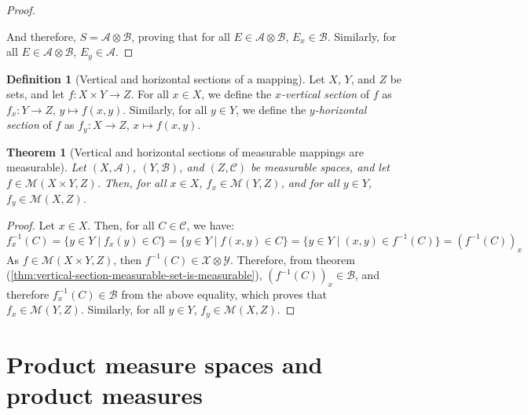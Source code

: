 \documentclass{article}
\newtheorem{theorem}{Theorem}[section]
\theoremstyle{definition}
\newtheorem{definition}{Definition}[section]
\theoremstyle{remark}
\theoremstyle{example}
\theoremstyle{notation}
\theoremstyle{axiom}
\begin{document}
\begin{proof}
\begin{itemize}
\begin{itemize}
				\end{itemize}
		\end{itemize}
		And therefore, $S = \mathcal{A} \otimes \mathcal{B}$, proving that for all $E \in \mathcal{A} \otimes \mathcal{B}$, $E_x \in \mathcal{B}$. Similarly, for all $E \in \mathcal{A} \otimes \mathcal{B}$, $E_y \in \mathcal{A}$.
\end{proof}

\begin{definition}[Vertical and horizontal sections of a mapping]%
		Let $X$, $Y$, and $Z$ be sets, and let $f : X \times Y \rightarrow Z$. For all $x \in X$, we define the \textit{$x$-vertical section} of $f$ as $f_x : Y \rightarrow Z$, $y \mapsto f(x, y)$. Similarly, for all $y \in Y$, we define the \textit{$y$-horizontal section} of $f$ as $f_y : X \rightarrow Z$, $x \mapsto f(x, y)$.
\end{definition}

\begin{theorem}[Vertical and horizontal sections of measurable mappings are measurable] \label{thm:sections-measurable-mappings-are-measurable}
		Let $(X, \mathcal{A})$, $(Y, \mathcal{B})$, and $(Z, \mathcal{C})$ be measurable spaces, and let $f \in \mathcal{M}(X \times Y, Z)$. Then, for all $x \in X$, $f_x \in \mathcal{M}(Y, Z)$, and for all $y \in Y$, $f_y \in \mathcal{M}(X, Z)$.
\end{theorem}

\begin{proof}
		Let $x \in X$. Then, for all $C \in \mathcal{C}$, we have:
		$$f_x^{-1}(C) = \{y \in Y \mid f_x(y) \in C\} = \{y \in Y \mid f(x, y) \in C\} = \{y \in Y \mid (x, y) \in f^{-1}(C)\} = (f^{-1}(C))_x$$
		As $f \in \mathcal{M}(X \times Y, Z)$, then $f^{-1}(C) \in \mathcal{X} \otimes \mathcal{Y}$. Therefore, from theorem (\ref{thm:vertical-section-measurable-set-is-measurable}), $(f^{-1}(C))_x \in \mathcal{B}$, and therefore $f_x^{-1}(C) \in \mathcal{B}$ from the above equality, which proves that $f_x \in \mathcal{M}(Y, Z)$. Similarly, for all $y \in Y$, $f_y \in \mathcal{M}(X, Z)$.
\end{proof}

\section{Product measure spaces and product measures}
\end{document}
